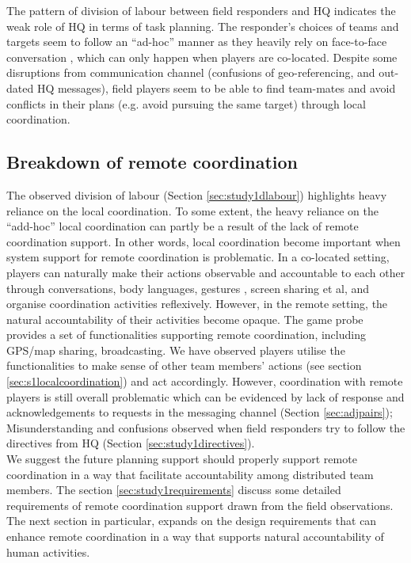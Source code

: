 The pattern of division of labour between field responders and HQ indicates the weak role of HQ in terms of task planning. The responder's choices of teams and targets seem to follow an ``ad-hoc'' manner as they heavily rely on face-to-face conversation , which can only happen when players are co-located. Despite some disruptions from communication channel (confusions of geo-referencing, and out-dated HQ messages), field players seem to be able to find team-mates and avoid conflicts in their plans (e.g. avoid pursuing the same target) through local coordination. 


\subsection{Breakdown of remote coordination}\label{sec:study1breakdown}
The observed division of labour (Section \ref{sec:study1dlabour}) highlights heavy reliance on the local coordination. To some extent, the heavy reliance on the ``add-hoc'' local coordination can partly be a result of the lack of remote coordination support. In other words, local coordination become important when system support for remote coordination is problematic. In a co-located setting, players can naturally make their actions observable and accountable to each other through conversations, body languages, gestures , screen sharing et al, and organise coordination activities reflexively. However, in the remote setting, the natural accountability of their activities become opaque. The game probe provides a set of functionalities supporting remote coordination, including GPS/map sharing, broadcasting. We have observed players utilise the functionalities to make sense of other team members' actions (see section \ref{sec:s1localcoordination}) and act accordingly. However, coordination with remote players is still overall problematic which can be evidenced by lack of response and acknowledgements to requests in the messaging channel (Section \ref{sec:adjpairs}); Misunderstanding and confusions observed when field responders try to follow the directives from HQ (Section \ref{sec:study1directives}).\\

We suggest the future planning support should properly support remote coordination in a way that facilitate accountability among distributed team members. The section \ref{sec:study1requirements} discuss some detailed requirements of remote coordination support drawn from the field observations. The next section in particular,  expands on the design requirements that can enhance remote coordination in a way that supports natural accountability of human activities.\\


